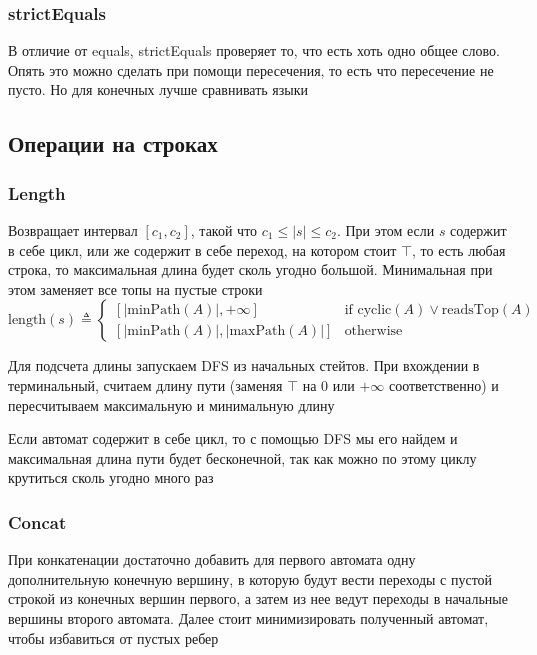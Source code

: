 \subsubsection*{strictEquals}
В отличие от equals, strictEquals проверяет то, что есть хоть одно общее слово. Опять это можно сделать при помощи пересечения, то есть что пересечение не пусто. Но для конечных лучше сравнивать языки





\newpage
\subsection{Операции на строках}
\subsubsection*{Length}
Возвращает интервал $[c_1, c_2]$, такой что $c_1 \leq |s| \leq c_2$. При этом если $s$ содержит в себе цикл, или же содержит в себе переход, на котором стоит $\top$, то есть любая строка, то максимальная длина будет сколь угодно большой. Минимальная при этом заменяет все топы на пустые строки
$$
\text{length}(s) \triangleq 
\begin{cases}
[\lvert \text{minPath}(A) \rvert, +\infty] & \text{if } \text{cyclic}(A) \lor \text{readsTop}(A) \\
[\lvert \text{minPath}(A) \rvert, \lvert \text{maxPath}(A) \rvert] & \text{otherwise}
\end{cases}
$$

Для подсчета длины запускаем DFS из начальных стейтов. При вхождении в терминальный, считаем длину пути (заменяя $\top$ на $0$ или $+\infty$ соответственно) и пересчитываем максимальную и минимальную длину

Если автомат содержит в себе цикл, то с помощью DFS мы его найдем и максимальная длина пути будет бесконечной, так как можно по этому циклу крутиться сколь угодно много раз

\subsubsection*{Concat}
При конкатенации достаточно добавить для первого автомата одну дополнительную конечную вершину, в которую будут вести переходы с пустой строкой из конечных вершин первого, а затем из нее ведут переходы в начальные вершины второго автомата. Далее стоит минимизировать полученный автомат, чтобы избавиться от пустых ребер

